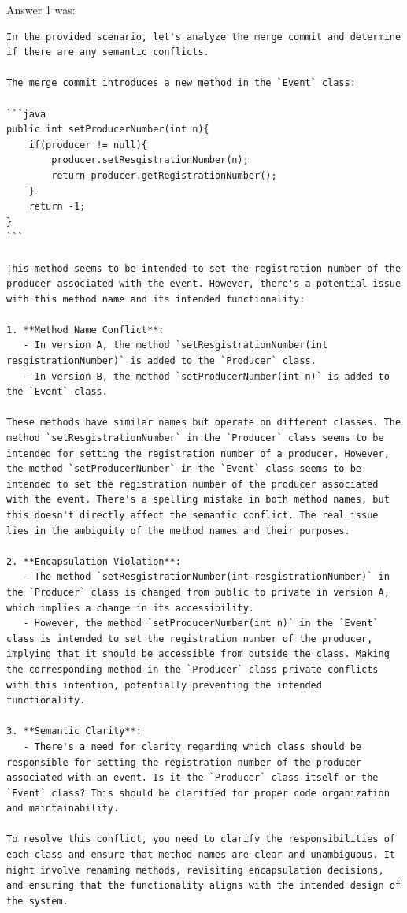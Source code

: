 Answer 1 was:
\begin{lstlisting}
In the provided scenario, let's analyze the merge commit and determine if there are any semantic conflicts.

The merge commit introduces a new method in the `Event` class:

```java
public int setProducerNumber(int n){
    if(producer != null){
        producer.setResgistrationNumber(n);
        return producer.getRegistrationNumber();
    }
    return -1;
}
```

This method seems to be intended to set the registration number of the producer associated with the event. However, there's a potential issue with this method name and its intended functionality:

1. **Method Name Conflict**:
   - In version A, the method `setResgistrationNumber(int resgistrationNumber)` is added to the `Producer` class.
   - In version B, the method `setProducerNumber(int n)` is added to the `Event` class.

These methods have similar names but operate on different classes. The method `setResgistrationNumber` in the `Producer` class seems to be intended for setting the registration number of a producer. However, the method `setProducerNumber` in the `Event` class seems to be intended to set the registration number of the producer associated with the event. There's a spelling mistake in both method names, but this doesn't directly affect the semantic conflict. The real issue lies in the ambiguity of the method names and their purposes.

2. **Encapsulation Violation**:
   - The method `setResgistrationNumber(int resgistrationNumber)` in the `Producer` class is changed from public to private in version A, which implies a change in its accessibility.
   - However, the method `setProducerNumber(int n)` in the `Event` class is intended to set the registration number of the producer, implying that it should be accessible from outside the class. Making the corresponding method in the `Producer` class private conflicts with this intention, potentially preventing the intended functionality.

3. **Semantic Clarity**:
   - There's a need for clarity regarding which class should be responsible for setting the registration number of the producer associated with an event. Is it the `Producer` class itself or the `Event` class? This should be clarified for proper code organization and maintainability.

To resolve this conflict, you need to clarify the responsibilities of each class and ensure that method names are clear and unambiguous. It might involve renaming methods, revisiting encapsulation decisions, and ensuring that the functionality aligns with the intended design of the system.
\end{lstlisting}

